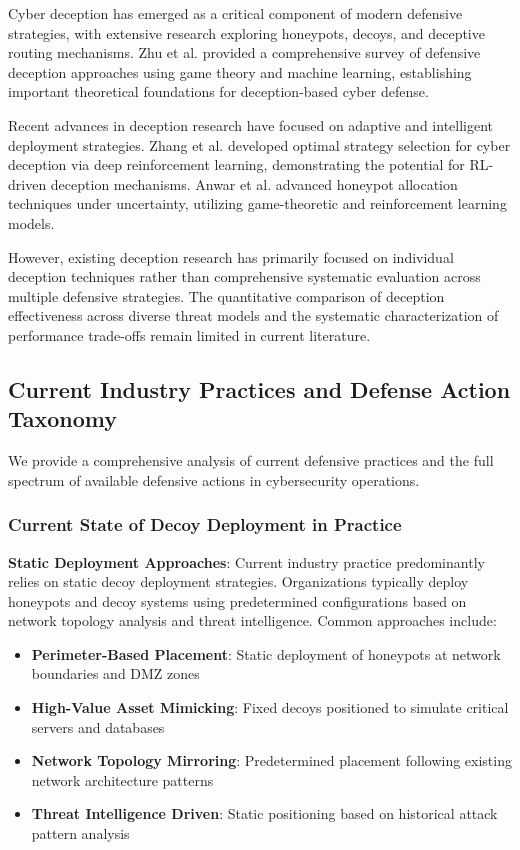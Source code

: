 \documentclass[12pt,twoside]{article}
\theoremstyle{definition}
\theoremstyle{plain}
\begin{document}
Cyber deception has emerged as a critical component of modern defensive strategies, with extensive research exploring honeypots, decoys, and deceptive routing mechanisms. Zhu et al. \cite{zhu2021survey} provided a comprehensive survey of defensive deception approaches using game theory and machine learning, establishing important theoretical foundations for deception-based cyber defense.

Recent advances in deception research have focused on adaptive and intelligent deployment strategies. Zhang et al. \cite{zhang2022optimal} developed optimal strategy selection for cyber deception via deep reinforcement learning, demonstrating the potential for RL-driven deception mechanisms. Anwar et al. \cite{anwar2022honeypot} advanced honeypot allocation techniques under uncertainty, utilizing game-theoretic and reinforcement learning models.

However, existing deception research has primarily focused on individual deception techniques rather than comprehensive systematic evaluation across multiple defensive strategies. The quantitative comparison of deception effectiveness across diverse threat models and the systematic characterization of performance trade-offs remain limited in current literature.

\subsection{Current Industry Practices and Defense Action Taxonomy}

We provide a comprehensive analysis of current defensive practices and the full spectrum of available defensive actions in cybersecurity operations.

\subsubsection{Current State of Decoy Deployment in Practice}

\textbf{Static Deployment Approaches}: Current industry practice predominantly relies on static decoy deployment strategies. Organizations typically deploy honeypots and decoy systems using predetermined configurations based on network topology analysis and threat intelligence. Common approaches include:

\begin{itemize}
\item \textbf{Perimeter-Based Placement}: Static deployment of honeypots at network boundaries and DMZ zones
\item \textbf{High-Value Asset Mimicking}: Fixed decoys positioned to simulate critical servers and databases  
\item \textbf{Network Topology Mirroring}: Predetermined placement following existing network architecture patterns
\item \textbf{Threat Intelligence Driven}: Static positioning based on historical attack pattern analysis
\end{itemize}
\end{document}
